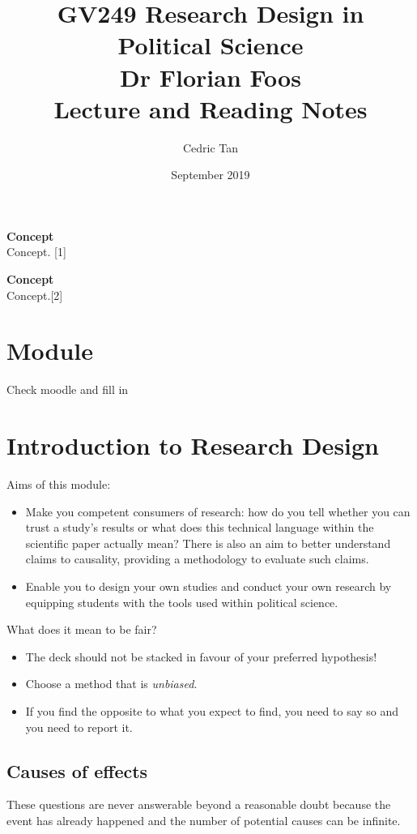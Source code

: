 \documentclass[12pt, letterpaper]{article}
\title{
	{GV249 Research Design in Political Science}\\
	{\large{Dr Florian Foos}}\\
	{\large{Lecture and Reading Notes}}
}
\author{Cedric Tan}
\date{September 2019}
\begin{document}
\maketitle
{\small
  \noindent\textbf{Concept}\\
  Concept. \hspace*{\fill}[1]

  \vspace{10pt}
  \noindent\textbf{Concept}\\
  Concept.\hspace*{\fill}[2]

\newpage
\tableofcontents
\newpage

\section{Module}
Check moodle and fill in

\section{Introduction to Research Design}
Aims of this module:
\begin{itemize}
	\item Make you competent consumers of research: how do you tell whether you can trust a study's results or what does this technical language within the scientific paper actually mean? There is also an aim to better understand claims to causality, providing a methodology to evaluate such claims.
	\item Enable you to design your own studies and conduct your own research by equipping students with the tools used within political science. 
\end{itemize}

What does it mean to be fair?
\begin{itemize}
	\item The deck should not be stacked in favour of your preferred hypothesis!
	\item Choose a method that is \textit{unbiased}.
	\item If you find the opposite to what you expect to find, you need to say so and you need to report it.

\end{itemize}
\subsection{Causes of effects}
These questions are never answerable beyond a reasonable doubt because the event has already happened and the number of potential causes can be infinite.

}
\end{document}

